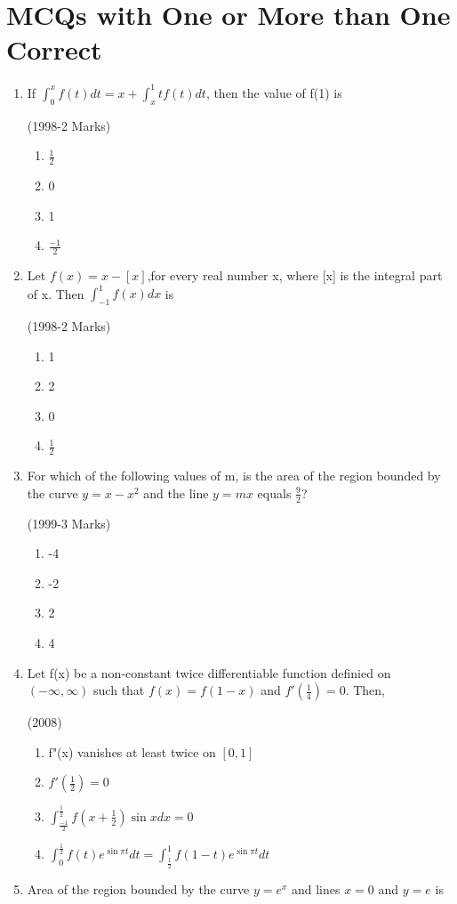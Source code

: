 \documentclass[journal,12pt,twocolumn]{IEEEtran}
\theoremstyle{remark}
\begin{document}
\section*{MCQs with One or More than One Correct}
\begin{enumerate}
	\item
		If $\int_{0}^{x}f(t)dt=x+\int_{x}^{1}tf(t)dt$, then the value of f(1) is 

		\hfill{(1998-2 Marks)}
		\begin{enumerate}[label=(\alph*)]
			\item $\frac{1}{2}$
			\item $0$
			\item 1
			\item $\frac{-1}{2}$
		\end{enumerate}
	\item
		Let $f(x)=x-[x]$,for every real number x, where [x] is the integral part of x. Then $\int_{-1}^{1}f(x)dx$ is 

		\hfill{(1998-2 Marks)}
		\begin{enumerate}[label=(\alph*)]
			\item 1
			\item 2
			\item 0
			\item $\frac{1}{2}$
		\end{enumerate}  
	\item 
		For which of the following values of m, is the area of the region bounded by the curve $y=x-x^2$ and the line $y=mx$ equals $\frac{9}{2}$?

		\hfill{(1999-3 Marks)}
		\begin{enumerate}[label=(\alph*)]
			\item -4
			\item -2
			\item 2
			\item 4
		\end{enumerate}
	\item 
		Let f(x) be a non-constant twice differentiable function definied on $(-\infty,\infty)$ such that $f(x)=f(1-x)$ and $f'(\frac{1}{4})=0$. Then,

		\hfill{(2008)}
		\begin{enumerate}[label=(\alph*)]
			\item f"(x) vanishes at least twice on $[0,1]$
			\item $f'(\frac{1}{2})=0$
			\item $\int_{\frac{-1}{2}}^{\frac{1}{2}}f(x+\frac{1}{2})\sin xdx=0$
			\item $\int_{0}^{\frac{1}{2}}f(t)e^{\sin \pi{t}}dt=\int_{\frac{1}{2}}^{1}f(1-t)e^{\sin \pi{t}}dt$
		\end{enumerate}
	\item
		Area of the region bounded by the curve $y=e^x$ and lines $x=0$ and $y=e$ is


\end{enumerate}
\end{document}
